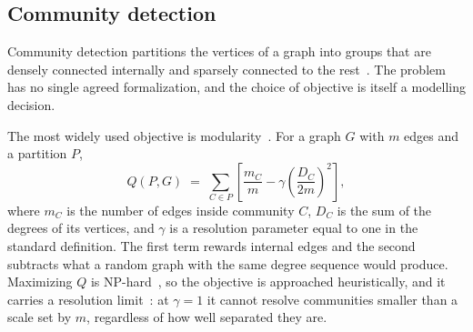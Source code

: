 %
%
%

\subsection{Community detection}\label{sec:background:cd}

Community detection partitions the vertices of a graph into groups that are
densely connected internally and sparsely connected to the
rest~\cite{fortunato2010community, fortunato202220}. The problem has no single
agreed formalization, and the choice of objective is itself a modelling decision.

The most widely used objective is modularity~\cite{newman2004finding,
newman2006modularity}. For a graph $G$ with $m$ edges and a partition $P$,
\begin{equation}\label{eq:modularity}
Q(P, G) \;=\; \sum_{C \in P} \left[ \frac{m_C}{m} - \gamma
\left( \frac{D_C}{2m} \right)^{\!2} \right],
\end{equation}
where $m_C$ is the number of edges inside community $C$, $D_C$ is the sum of the
degrees of its vertices, and $\gamma$ is a resolution parameter equal to one in
the standard definition. The first term rewards internal edges and the second
subtracts what a random graph with the same degree sequence would produce.
Maximizing $Q$ is NP-hard~\cite{brandes2007modularity}, so the objective is
approached heuristically, and it carries a resolution
limit~\cite{fortunato2007resolution}: at $\gamma = 1$ it cannot resolve
communities smaller than a scale set by $m$, regardless of how well separated
they are.

